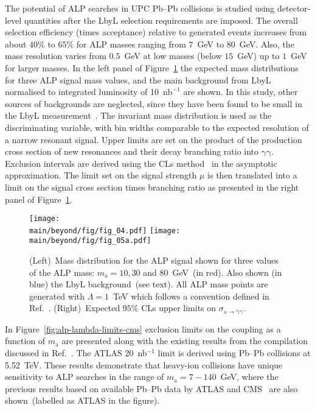 The potential of ALP searches in UPC Pb--Pb collisions is studied using detector-level quantities after the LbyL selection requirements are imposed. The overall selection efficiency (times acceptance) relative to generated events increases from about $40$\% to $65$\% for ALP masses ranging from $7$~GeV to $80$~GeV. Also, the mass resolution varies from $0.5$~GeV at low masses (below $15$~GeV) up to $1$~GeV for larger masses. In the left panel of Figure~\ref{fig:alp} the expected mass distributions for three ALP signal mass values, and the main background from LbyL normalised to integrated luminosity of 10~$\mathrm{nb}^{-1}$ are shown. In this study, other sources of backgrounds are neglected, since they have been found to be small in the LbyL measurement~\cite{Aaboud:2017bwk}. The invariant mass distribution is used as the discriminating variable, with bin widths comparable to the expected resolution of a narrow resonant signal.
Upper limits are set on the product of the production cross section of
new resonances and their decay branching ratio into $\mathrm{\gamma\gamma}$. Exclusion intervals are derived using the CLs method~\cite{Read:2002hq} in the asymptotic approximation. The limit set on the signal strength $\mu$ is then translated into a limit on the signal cross section times branching ratio as presented in the right panel of Figure~\ref{fig:alp}.
\begin{figure}[!htbp]
\centering
  \texttt{[image: \\main/beyond/fig/fig\_04.pdf]}
  \texttt{[image: \\main/beyond/fig/fig\_05a.pdf]}
  \caption{(Left)~Mass distribution for the ALP signal
  shown for three values of the ALP mass: $m_\mathrm{a}=10, 30$ and
  $80$~GeV~(in red). Also shown (in blue) the LbyL background~(see
  text). All ALP mass points are generated with $\Lambda = 1$~TeV which follows a convention defined in Ref.~\cite{Knapen:2016moh}.
  (Right)~Expected $95$\% CLs upper limits on $\sigma_{\mathrm{a\rightarrow \gamma \gamma}}$.}
  \label{fig:alp}
\end{figure}

In Figure~\ref{fig:alp-lambda-limits-cms} exclusion limits on the coupling as a function of $m_\mathrm{a}$ are presented along with the existing results from the compilation discussed in Ref.~\cite{Baldenegro:2018hng}. The ATLAS 20~nb$^{-1}$ limit is derived using Pb--Pb collisions at 5.52~TeV. These results demonstrate that heavy-ion collisions have unique sensitivity to ALP searches in the range of $m_\mathrm{a}=7-140$~GeV, where the previous results based on available Pb--Pb data by ATLAS and CMS~\cite{Knapen:2016moh,Sirunyan:2018fhl} are also shown~(labelled as ATLAS  in the figure).

